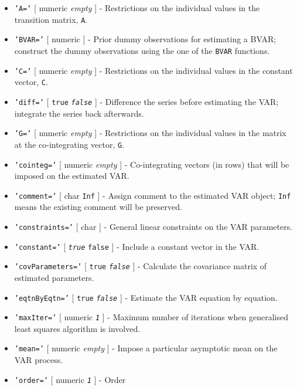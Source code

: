  \begin{itemize}
 \item
   \texttt{'A='} {[} numeric \textbar{} \emph{empty} {]} - Restrictions
   on the individual values in the transition matrix, \texttt{A}.
 \item
   \texttt{'BVAR='} {[} numeric {]} - Prior dummy observations for
   estimating a BVAR; construct the dummy observations using the one of
   the \texttt{BVAR} functions.
 \item
   \texttt{'C='} {[} numeric \textbar{} \emph{empty} {]} - Restrictions
   on the individual values in the constant vector, \texttt{C}.
 \item
   \texttt{'diff='} {[} \texttt{true} \textbar{} \emph{\texttt{false}}
   {]} - Difference the series before estimating the VAR; integrate the
   series back afterwards.
 \item
   \texttt{'G='} {[} numeric \textbar{} \emph{empty} {]} - Restrictions
   on the individual values in the matrix at the co-integrating vector,
   \texttt{G}.
 \item
   \texttt{'cointeg='} {[} numeric \textbar{} \emph{empty} {]} -
   Co-integrating vectors (in rows) that will be imposed on the estimated
   VAR.
 \item
   \texttt{'comment='} {[} char \textbar{} \texttt{Inf} {]} - Assign
   comment to the estimated VAR object; \texttt{Inf} means the existing
   comment will be preserved.
 \item
   \texttt{'constraints='} {[} char {]} - General linear constraints on
   the VAR parameters.
 \item
   \texttt{'constant='} {[} \emph{\texttt{true}} \textbar{}
   \texttt{false} {]} - Include a constant vector in the VAR.
 \item
   \texttt{'covParameters='} {[} \texttt{true} \textbar{}
   \emph{\texttt{false}} {]} - Calculate the covariance matrix of
   estimated parameters.
 \item
   \texttt{'eqtnByEqtn='} {[} \texttt{true} \textbar{}
   \emph{\texttt{false}} {]} - Estimate the VAR equation by equation.
 \item
   \texttt{'maxIter='} {[} numeric \textbar{} \emph{\texttt{1}} {]} -
   Maximum number of iterations when generalised least squares algorithm
   is involved.
 \item
   \texttt{'mean='} {[} numeric \textbar{} \emph{empty} {]} - Impose a
   particular asymptotic mean on the VAR process.
 \item
   \texttt{'order='} {[} numeric \textbar{} \emph{\texttt{1}} {]} - Order

\end{itemize}

